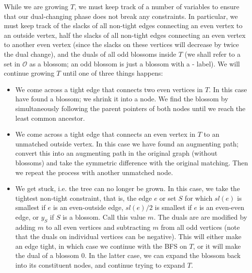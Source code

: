 \documentclass{article}
\begin{document}
While we are growing $T$, we must keep track of a number of variables to ensure that our dual-changing phase does not break any constraints. In particular, we must keep track of the slacks of all non-tight edges connecting an even vertex to an outside vertex, half the slacks of all non-tight edges connecting an even vertex to another even vertex (since the slacks on these vertices will decrease by twice the dual change), and the duals of all odd blossoms inside $T$ (we shall refer to a set in $\mathcal{O}$ as a blossom; an odd blossom is just a blossom with a - label). We will continue growing $T$ until one of three things happens:

\begin{itemize}
	\item We come across a tight edge that connects two even vertices in $T$. In this case have found a blossom; we shrink it into a node. We find the blossom by simultaneously following the parent pointers of both nodes until we reach the least common ancestor.
 	\item We come across a tight edge that connects an even vertex in $T$ to an unmatched outside vertex. In this case we have found an augmenting path; convert this into an augmenting path in the original graph (without blossoms) and take the symmetric difference with the original matching. Then we repeat the process with another unmatched node.
    \item We get stuck, i.e. the tree can no longer be grown. In this case, we take the tightest non-tight constraint, that is, the edge $e$ or set $S$ for which $sl(e)$ is smallest if $e$ is an even-outside edge, $sl(e)/2$ is smallest if $e$ is an even-even edge, or $y_S$ if $S$ is a blossom. Call this value $m$. The duals are are modified by adding $m$ to all even vertices and subtracting $m$ from all odd vertices (note that the duals on individual vertices can be negative). This will either make an edge tight, in which case we continue with the BFS on $T$, or it will make the dual of a blossom $0$. In the latter case, we can expand the blossom back into its constituent nodes, and continue trying to expand $T$.
\end{itemize}


\end{document}

